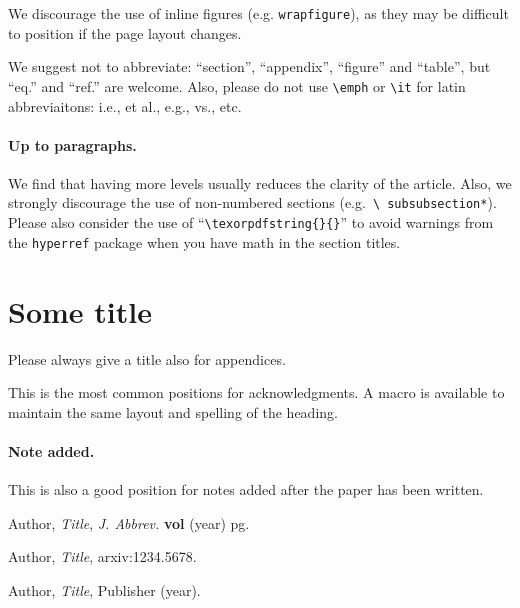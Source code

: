 \documentclass[a4paper,11pt]{article}
\begin{document}
We discourage the use of inline figures (e.g. \texttt{wrapfigure}), as they may be
difficult to position if the page layout changes.

We suggest not to abbreviate: ``section'', ``appendix'', ``figure''
and ``table'', but ``eq.'' and ``ref.'' are welcome. Also, please do
not use \texttt{\textbackslash emph} or \texttt{\textbackslash it} for
latin abbreviaitons: i.e., et al., e.g., vs., etc.


\paragraph{Up to paragraphs.} We find that having more levels usually
reduces the clarity of the article. Also, we strongly discourage the
use of non-numbered sections (e.g.~\texttt{\textbackslash
  subsubsection*}).  Please also consider the use of
``\texttt{\textbackslash texorpdfstring\{\}\{\}}'' to avoid warnings
from the \texttt{hyperref} package when you have math in the section titles.



\appendix
\section{Some title}
Please always give a title also for appendices.





\acknowledgments

This is the most common positions for acknowledgments. A macro is
available to maintain the same layout and spelling of the heading.

\paragraph{Note added.} This is also a good position for notes added
after the paper has been written.





\begin{thebibliography}{99}

Author,
\emph{Title},
\emph{J. Abbrev.} {\bf vol} (year) pg.

Author,
\emph{Title},
arxiv:1234.5678.

Author,
\emph{Title},
Publisher (year).

\end{thebibliography}
\end{document}

